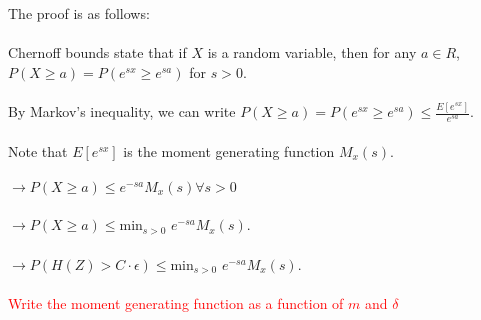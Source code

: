 The proof is as follows:
\\
\\
Chernoff bounds state that if $X$ is a random variable, then for any $a \in R$, $P(X \geq a) = P(e^{sx} \geq e^{sa})$ for $s > 0$. 
\\
\\
By Markov's inequality, we can write $P(X \geq a)  = P(e^{sx} \geq e^{sa}) \leq \frac{E[e^{sx}]}{e^{sa}}$. 
\\
\\
Note that $E[e^{sx}]$ is the moment generating function $M_{x}(s)$. 
\\
\\
$\rightarrow P(X \geq a) \leq e^{-sa} M_{x}(s) \forall s > 0$
\\
\\
$\rightarrow P(X \geq a) \leq $min$_{s >0}$ $e^{-sa} M_{x}(s)$.
\\
\\
$\rightarrow P(H(Z) > C \cdot \epsilon) \leq $min$_{s >0}$ $e^{-sa} M_{x}(s)$.
\\
\\
\textcolor{red}{Write the moment generating function as a function of $m$ and $\delta$}






